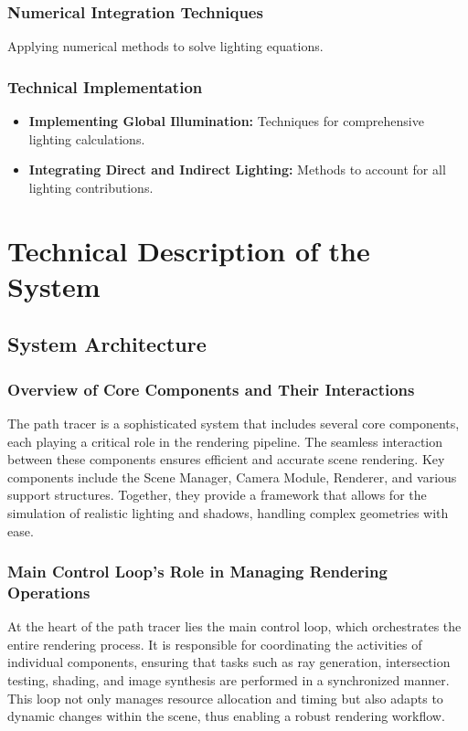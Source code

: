 \documentclass[12pt]{article}
\begin{document}
\subsubsection{Numerical Integration Techniques}
Applying numerical methods to solve lighting equations.
\subsubsection{Technical Implementation}
\begin{itemize}
    \item \textbf{Implementing Global Illumination:} Techniques for comprehensive lighting calculations.
    \item \textbf{Integrating Direct and Indirect Lighting:} Methods to account for all lighting contributions.
\end{itemize}

\section{Technical Description of the System}
\label{sec:system-description}

\subsection{System Architecture}

\subsubsection{Overview of Core Components and Their Interactions}
The path tracer is a sophisticated system that includes several core components, each playing a critical role in the rendering pipeline. The seamless interaction between these components ensures efficient and accurate scene rendering. Key components include the Scene Manager, Camera Module, Renderer, and various support structures. Together, they provide a framework that allows for the simulation of realistic lighting and shadows, handling complex geometries with ease.

\subsubsection{Main Control Loop's Role in Managing Rendering Operations}
At the heart of the path tracer lies the main control loop, which orchestrates the entire rendering process. It is responsible for coordinating the activities of individual components, ensuring that tasks such as ray generation, intersection testing, shading, and image synthesis are performed in a synchronized manner. This loop not only manages resource allocation and timing but also adapts to dynamic changes within the scene, thus enabling a robust rendering workflow.
\end{document}
